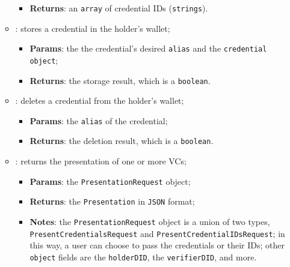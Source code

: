\begin{itemize}
\begin{itemize}
\begin{itemize}
            \item \textbf{Returns}: an \texttt{array} of credential IDs (\texttt{strings}).
        \end{itemize}
        \item[] : stores a credential in the holder's wallet;
        \begin{itemize}
            \item \textbf{Params}: the the credential's desired \texttt{alias} and the
            \texttt{credential object};
            \item \textbf{Returns}: the storage result, which is a \texttt{boolean}.
        \end{itemize}
        \item[] : deletes a credential from the holder's wallet;
        \begin{itemize}
            \item \textbf{Params}: the \texttt{alias} of the credential;
            \item \textbf{Returns}: the deletion result, which is a \texttt{boolean}.
        \end{itemize}
        \item[] : returns the presentation of one or more VCs;
        \begin{itemize}
            \item \textbf{Params}: the \texttt{PresentationRequest} object;
            \item \textbf{Returns}: the \texttt{Presentation} in \texttt{JSON} format;
            \item \textbf{Notes}: the \texttt{PresentationRequest} object is a union of two
            types, \texttt{PresentCredentialsRequest} and \texttt{PresentCredentialIDsRequest};
            in this way, a user can choose to pass the credentials or their IDs; other \texttt{object}
            fields are the \texttt{holderDID}, the \texttt{verifierDID}, and more.
        \end{itemize}
    \end{itemize}


\end{itemize}
